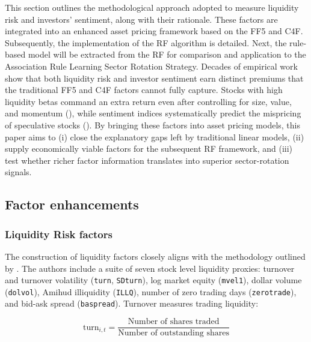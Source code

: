 This section outlines the methodological approach adopted to measure liquidity risk and investors' sentiment, along with their rationale. These factors are integrated into an enhanced asset pricing framework based on the FF5 and C4F. Subsequently, the implementation of the RF algorithm is detailed. Next, the rule-based model will be extracted from the RF for comparison and application to the Association Rule Learning Sector Rotation Strategy. Decades of empirical work show that both liquidity risk and investor sentiment earn distinct premiums that the traditional FF5 and C4F factors cannot fully capture. Stocks with high liquidity betas command an extra return even after controlling for size, value, and momentum (), while sentiment indices systematically predict the mispricing of speculative stocks (). By bringing these factors into asset pricing models, this paper aims to (i) close the explanatory gaps left by traditional linear models, (ii) supply economically viable factors for the subsequent RF framework, and (iii) test whether richer factor information translates into superior sector-rotation signals. 

\subsection{Factor enhancements}
\subsubsection{Liquidity Risk factors}

The construction of liquidity factors closely aligns with the methodology outlined by . The authors include a suite of seven stock level liquidity proxies: turnover and turnover volatility (\texttt{turn}, \texttt{SDturn}), log market equity (\texttt{mvel1}), dollar volume (\texttt{dolvol}), Amihud illiquidity (\texttt{ILLQ}), number of zero trading days (\texttt{zerotrade}), and bid-ask spread (\texttt{baspread}). Turnover measures trading liquidity:

\begin{equation}
\text{turn}_{i,t} = \frac{\text{Number of shares traded}}{\text{Number of outstanding shares}}
\end{equation}

